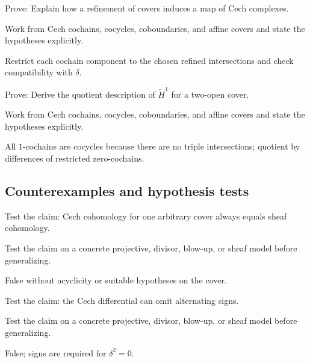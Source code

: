 \begin{exercise}\label{exr:vi47-expand-08}
Prove: Explain how a refinement of covers induces a map of Cech complexes.
\end{exercise}
\begin{hint}
Work from Cech cochains, cocycles, coboundaries, and affine covers and state the hypotheses explicitly.
\end{hint}
\begin{solution}
Restrict each cochain component to the chosen refined intersections and check compatibility with $\delta$.
\end{solution}

\begin{exercise}\label{exr:vi47-expand-09}
Prove: Derive the quotient description of $\check H^1$ for a two-open cover.
\end{exercise}
\begin{hint}
Work from Cech cochains, cocycles, coboundaries, and affine covers and state the hypotheses explicitly.
\end{hint}
\begin{solution}
All $1$-cochains are cocycles because there are no triple intersections; quotient by differences of restricted zero-cochains.
\end{solution}

\subsection*{Counterexamples and hypothesis tests}

\begin{exercise}\label{exr:vi47-expand-10}
Test the claim: Cech cohomology for one arbitrary cover always equals sheaf cohomology.
\end{exercise}
\begin{hint}
Test the claim on a concrete projective, divisor, blow-up, or sheaf model before generalizing.
\end{hint}
\begin{solution}
False without acyclicity or suitable hypotheses on the cover.
\end{solution}

\begin{exercise}\label{exr:vi47-expand-11}
Test the claim: the Cech differential can omit alternating signs.
\end{exercise}
\begin{hint}
Test the claim on a concrete projective, divisor, blow-up, or sheaf model before generalizing.
\end{hint}
\begin{solution}
False; signs are required for $\delta^2=0$.
\end{solution}


